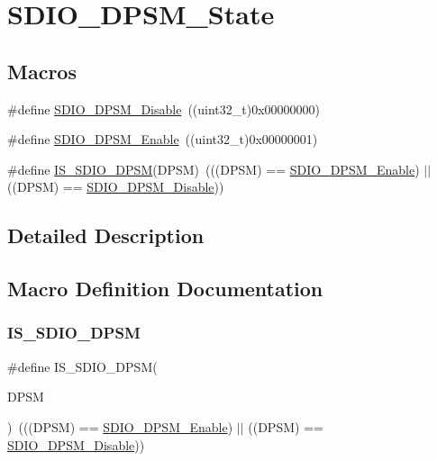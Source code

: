 \hypertarget{group___s_d_i_o___d_p_s_m___state}{}\section{S\+D\+I\+O\+\_\+\+D\+P\+S\+M\+\_\+\+State}
\label{group___s_d_i_o___d_p_s_m___state}
\subsection*{Macros}
\begin{DoxyCompactItemize}
\item 
\#define \mbox{\hyperlink{group___s_d_i_o___d_p_s_m___state_ga156a9f6ab87a46dcb99ddd7462ca064b}{S\+D\+I\+O\+\_\+\+D\+P\+S\+M\+\_\+\+Disable}}~((uint32\+\_\+t)0x00000000)
\item 
\#define \mbox{\hyperlink{group___s_d_i_o___d_p_s_m___state_ga22bc12465c1cf839145619a859276c37}{S\+D\+I\+O\+\_\+\+D\+P\+S\+M\+\_\+\+Enable}}~((uint32\+\_\+t)0x00000001)
\item 
\#define \mbox{\hyperlink{group___s_d_i_o___d_p_s_m___state_gac87a2d7a8fc417a4514d733be50e6d63}{I\+S\+\_\+\+S\+D\+I\+O\+\_\+\+D\+P\+SM}}(D\+P\+SM)~(((D\+P\+SM) == \mbox{\hyperlink{group___s_d_i_o___d_p_s_m___state_ga22bc12465c1cf839145619a859276c37}{S\+D\+I\+O\+\_\+\+D\+P\+S\+M\+\_\+\+Enable}}) $\vert$$\vert$ ((D\+P\+SM) == \mbox{\hyperlink{group___s_d_i_o___d_p_s_m___state_ga156a9f6ab87a46dcb99ddd7462ca064b}{S\+D\+I\+O\+\_\+\+D\+P\+S\+M\+\_\+\+Disable}}))
\end{DoxyCompactItemize}


\subsection{Detailed Description}


\subsection{Macro Definition Documentation}
\mbox{\label{group___s_d_i_o___d_p_s_m___state_gac87a2d7a8fc417a4514d733be50e6d63}} 
\subsubsection{\texorpdfstring{IS\_SDIO\_DPSM}{IS\_SDIO\_DPSM}}
{\footnotesize\ttfamily \#define I\+S\+\_\+\+S\+D\+I\+O\+\_\+\+D\+P\+SM(\begin{DoxyParamCaption}\item[{}]{D\+P\+SM }\end{DoxyParamCaption})~(((D\+P\+SM) == \mbox{\hyperlink{group___s_d_i_o___d_p_s_m___state_ga22bc12465c1cf839145619a859276c37}{S\+D\+I\+O\+\_\+\+D\+P\+S\+M\+\_\+\+Enable}}) $\vert$$\vert$ ((D\+P\+SM) == \mbox{\hyperlink{group___s_d_i_o___d_p_s_m___state_ga156a9f6ab87a46dcb99ddd7462ca064b}{S\+D\+I\+O\+\_\+\+D\+P\+S\+M\+\_\+\+Disable}}))}


